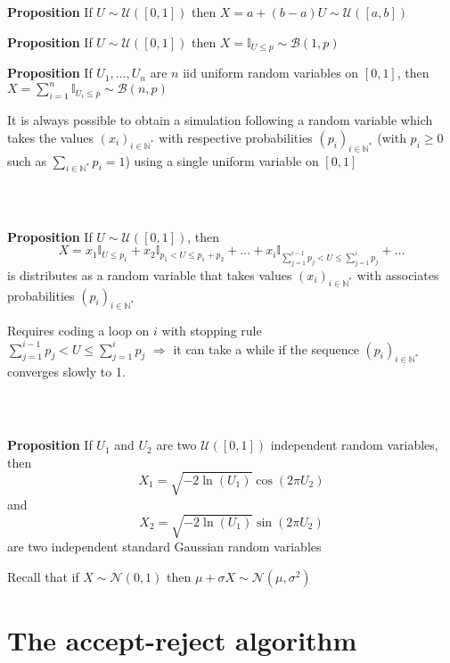 \documentclass[notes,professionalfont,11pt,usenames,dvipsnames]{beamer}
\renewcommand{\mathcal}{\mathscr}
\newcommand{\ds}{\displaystyle}
\renewcommand{\mathcal}{\mathscr}
\newcommand\justify{\rightskip0pt \leftskip0pt}
\newenvironment{slide}
{\begin{frame}[environment=slide]
\frametitle{\insertsection \\ \insertsubsection}\justify\setlength{\parskip}{0.5cm}\vspace{-0.5cm}}
{\end{frame}}
\begin{document}
\begin{slide}

{\bf Proposition} If $U\sim\mathcal{U}([0,1])$ then $X=a+(b-a)U\sim\mathcal{U}([a,b])$

{\bf Proposition} If $U\sim\mathcal{U}([0,1])$ then $X=\mathbb{I}_{U\leq p}\sim\mathcal{B}(1,p)$ 

{\bf Proposition} If $U_1,\ldots,U_n$ are $n$ iid uniform random variables on $[0,1]$,
then $\ds X=\sum_{i=1}^n \mathbb{I}_{U_i\leq p}\sim\mathcal{B}(n,p)$

It is always possible to obtain a simulation following a random variable which takes the 
values $(x_i)_{i\in\mathbb{N}^*}$ with respective probabilities $(p_i)_{i\in\mathbb{N}^*}$ 
(with $p_i\geq 0$ such as $\sum_{i \in\mathbb{N}^*} p_i = 1$) using a single uniform 
variable on $[0,1]$

\end{slide}

\begin{slide}

{\bf Proposition} If $U\sim\mathcal{U}([0,1])$, then
$$
X=x_1\mathbb{I}_{U\leq p_1}+x_2\mathbb{I}_{p_1<U\leq p_1+p_2}+\ldots+
x_i\mathbb{I}_{\sum_{j=1}^{i-1}p_j<U\leq \sum_{j=1}^{i}p_j}+\ldots
$$
is distributes as a random variable that takes values $(x_i)_{i\in\mathbb{N}^*}$ 
with associates probabilities $(p_i)_{i\in\mathbb{N}^*}$

Requires coding a loop on $i$ with stopping rule \\ $\sum_{j=1}^{i-1}p_j<U\leq \sum_{j=1}^{i}p_j$ 
$\Longrightarrow$ it can take a while if the sequence $(p_i)_{i\in\mathbb{N}^*}$ converges slowly to 1.

\end{slide}

\begin{slide}

{\bf Proposition} If $U_1$ and $U_2$ are two $\mathcal{U}([0,1])$ 
independent random variables, then
$$
X_1=\sqrt{-2\ln(U_1)}\cos(2\pi U_2)
$$
and
$$
X_2=\sqrt{-2\ln(U_1)}\sin(2\pi U_2)
$$
are two independent standard Gaussian random variables

Recall that if $X\sim\mathcal{N}(0,1)$ then 
$\mu+\sigma X\sim\mathcal{N}(\mu,\sigma^2)$

\end{slide}

\section{The accept-reject algorithm}
\end{document}
